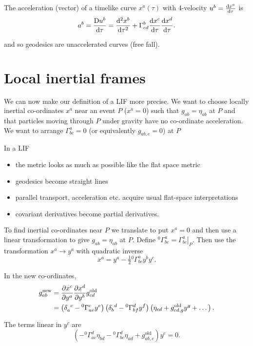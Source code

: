 \documentclass{notes}
\newcommand{\absdf}[2]{\frac{\uD#1}{\ud#2}}
\begin{document}
The acceleration (vector) of a timelike curve $x^a(\tau)$ with
4-velocity $u^b = \frac{\mathrm{d} x^a}{\mathrm{d}\tau}$ is
\[
a^b = \absdf{u^b}{\tau} = \diff{^2 x^b}{\tau^2} + \Gamma^b_{cd}
\diff{x^c}{\tau} \diff{x^d}{\tau}.
\]

and so geodesics are unaccelerated curves (free fall).

\section{Local inertial frames}

We can now make our definition of a LIF more precise.  We want to
choose locally inertial co-ordinates $x^a$ near an event $P$ ($x^a =
0$) such that $g_{ab} = \eta_{ab}$ at $P$ and that particles moving
through $P$ under gravity have no co-ordinate acceleration.  We want
to arrange $\Gamma^a_{bc} = 0$ (or equivalently $g_{ab,c} = 0$) at $P$

In a LIF

\begin{itemize}
\item the metric looks as much as possible like the flat space metric
\item geodesics become straight lines
\item parallel transport, acceleration etc. acquire usual flat-space
  interpretations
\item covariant derivatives become partial derivatives.
\end{itemize}

To find inertial co-ordinates near $P$ we translate to put $x^a  = 0$
and then use a linear transformation to give $g_{ab} = \eta_{ab}$ at
$P$.   Define ${}^0\Gamma^a_{bc} = \left.\Gamma^a_{bc}\right|_P$.
Then use the transformation $x^a \to y^a$ with quadratic inverse
\[
x^a = y^a - \tfrac{1}{2} {}^0\Gamma^a_{bc} y^b y^c.
\]

In the new co-ordinates,
\begin{align*}
g^{\text{new}}_{ab} &= \frac{\partial x^c}{\partial y^a} \frac{\partial x^d}{\partial y^b} g^{\text{old}}_{cd}
\\
&= \left(\delta_a^{\phantom{a}c} - {}^0 \Gamma^c_{ae} y^e\right)
\left(\delta_b^{\phantom{b}d} - {}^0\Gamma^d_{bf} y^f \right)
\left(\eta_{cd} + g^{\text{old}}_{cd,g} y^g + \dots\right).
\end{align*}

The terms linear in $y^c$ are
\[
\left(- {}^0\Gamma^d_{ac} \eta_{bd} - {}^0\Gamma^d_{bc} \eta_{ad} +
g^{\text{old}}_{ab,c} \right) y^c = 0.
\]
\end{document}
